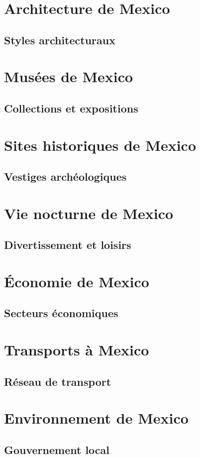 \documentclass[12pt, a4paper]{article}
\begin{document}
\section{Architecture de Mexico}
\subsection{Styles architecturaux}
\section{Musées de Mexico}
\subsection{Collections et expositions}
\section{Sites historiques de Mexico}
\subsection{Vestiges archéologiques}
\section{Vie nocturne de Mexico}
\subsection{Divertissement et loisirs}
\section{Économie de Mexico}
\subsection{Secteurs économiques}
\section{Transports à Mexico}
\subsection{Réseau de transport}
\section{Environnement de Mexico}
\subsection{Gouvernement local}
\end{document}
